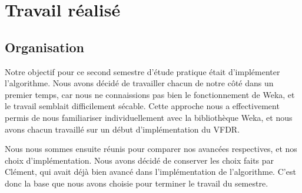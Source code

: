\section{Travail réalisé}

    \subsection{Organisation} 

        Notre objectif pour ce second semestre d’étude pratique était d’implémenter l’algorithme. Nous avons décidé de travailler chacun de notre côté dans un premier temps, car nous ne connaissions pas bien le fonctionnement de Weka, et le travail semblait difficilement sécable. Cette approche nous a effectivement permis de nous familiariser individuellement avec la bibliothèque Weka, et nous avons chacun travaillé sur un début d’implémentation du VFDR.

        Nous nous sommes ensuite réunis pour comparer nos avancées respectives, et nos choix d’implémentation. Nous avons décidé de conserver les choix faits par Clément, qui avait déjà bien avancé dans l’implémentation de l’algorithme. C’est donc la base que nous avons choisie pour terminer le travail du semestre.


